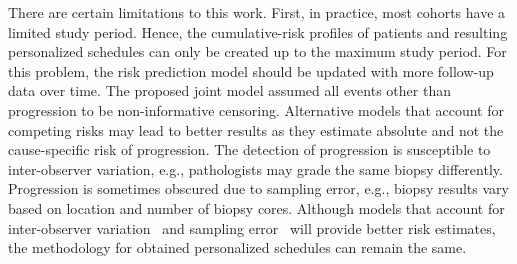 There are certain limitations to this work. First, in practice, most cohorts have a limited study period. Hence, the cumulative-risk profiles of patients and resulting personalized schedules can only be created up to the maximum study period. For this problem, the risk prediction model should be updated with more follow-up data over time. The proposed joint model assumed all events other than progression to be non-informative censoring. Alternative models that account for competing risks may lead to better results as they estimate absolute and not the cause-specific risk of progression. The detection of progression is susceptible to inter-observer variation, e.g., pathologists may grade the same biopsy differently. Progression is sometimes obscured due to sampling error, e.g., biopsy results vary based on location and number of biopsy cores. Although models that account for inter-observer variation~\citep{balasubramanian2003estimation} and sampling error~\citep{coley2017prediction} will provide better risk estimates, the methodology for obtained personalized schedules can remain the same.